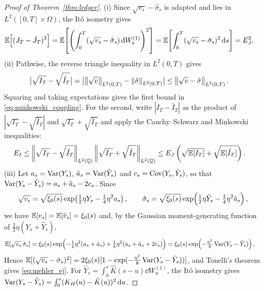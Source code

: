 \begin{proof}[Proof of Theorem~\ref{thm:ledger}]
(i) Since $\sqrt{v_s}-\hat{\sigma}_s$ is adapted and lies in $L^2([0,T]\times\Omega)$, the It\^o isometry gives
\[
  \begin{aligned}
  \mathbb{E}\!\left[(J_T-\hat{J}_T)^2\right]
  &= \mathbb{E}\!\left[\left(\int_0^T(\sqrt{v_s}-\hat{\sigma}_s)\,\mathrm{d} W_s^{(1)}\right)^2\right]
   = \mathbb{E}\!\left[\int_0^T(\sqrt{v_s}-\hat{\sigma}_s)^2\,\mathrm{d} s\right]
  = E_J^2.
  \end{aligned}
\]
(ii) Pathwise, the reverse triangle inequality in $L^2(0,T)$ gives
\[
  \begin{aligned}
  \bigl|\sqrt{I_T}-\sqrt{\hat{I}_T}\bigr|
  &= \bigl|\left\lVert \sqrt{v}\right\rVert_{L^2(0,T)}-\left\lVert \hat{\sigma}\right\rVert_{L^2(0,T)}\bigr|
   \le \left\lVert \sqrt{v}-\hat{\sigma}\right\rVert_{L^2(0,T)}.
  \end{aligned}
\]
Squaring and taking expectations gives the first bound in \eqref{eq:minkowski_coupling}. For the second, write $|I_T-\hat{I}_T|$ as the product of $|\sqrt{I_T}-\sqrt{\hat{I}_T}|$ and $\sqrt{I_T}+\sqrt{\hat{I}_T}$ and apply the Cauchy--Schwarz and Minkowski inequalities:
\[
  \begin{aligned}
  E_I
  &\le \left\lVert \sqrt{I_T}-\sqrt{\hat{I}_T}\right\rVert_{L^2(\mathbb{Q})}  \left\lVert \sqrt{I_T}+\sqrt{\hat{I}_T}\right\rVert_{L^2(\mathbb{Q})}
   \le E_J\left(\sqrt{\mathbb{E}[I_T]}+\sqrt{\mathbb{E}[\hat{I}_T]}\right).
  \end{aligned}
\]
(iii) Let $a_s=\operatorname{Var}(Y_s)$, $\hat{a}_s=\operatorname{Var}(\hat{Y}_s)$ and $c_s=\operatorname{Cov}(Y_s,\hat{Y}_s)$, so that $\operatorname{Var}(Y_s-\hat{Y}_s)=a_s+\hat{a}_s-2c_s$. Since
\[
  \begin{gathered}
  \sqrt{v_s}=\sqrt{\xi_0(s)}\exp\!\left(\tfrac12\eta Y_s-\tfrac14\eta^2 a_s\right),
  \qquad
  \hat{\sigma}_s=\sqrt{\xi_0(s)}\exp\!\left(\tfrac12\eta\hat{Y}_s-\tfrac14\eta^2\hat{a}_s\right),
  \end{gathered}
\]
we have $\mathbb{E}[v_s]=\mathbb{E}[\hat{v}_s]=\xi_0(s)$ and, by the Gaussian moment-generating function of $\tfrac12\eta(Y_s+\hat{Y}_s)$,
\[
  \begin{aligned}
  \mathbb{E}\!\left[\sqrt{v_s}\,\hat{\sigma}_s\right]
  &= \xi_0(s)\exp\Bigl(-\tfrac14\eta^2(a_s+\hat{a}_s)  + \tfrac18\eta^2(a_s+\hat{a}_s+2c_s)\Bigr)
   = \xi_0(s)\exp\!\left(-\tfrac{\eta^2}{8}\operatorname{Var}(Y_s-\hat{Y}_s)\right).
  \end{aligned}
\]
Hence $\mathbb{E}[(\sqrt{v_s}-\hat{\sigma}_s)^2]=2\xi_0(s)[1-\exp(-\tfrac{\eta^2}{8}\operatorname{Var}(Y_s-\hat{Y}_s))]$, and Tonelli's theorem gives \eqref{eq:mehler_ej}. For $\hat{Y}_s=\int_0^s\hat{K}(s-u)\dd W_u^{(1)}$, the It\^o isometry gives $\operatorname{Var}(Y_s-\hat{Y}_s)=\int_0^s(K_H(u)-\hat{K}(u))^2\,\mathrm{d} u$.
\end{proof}

